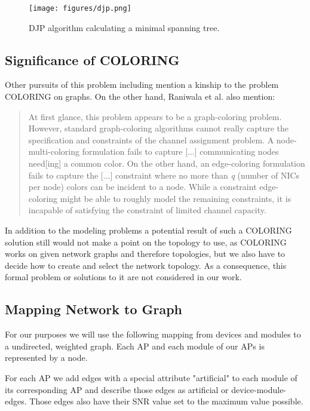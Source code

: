     \begin{figure}[th!]
      \centering
      \texttt{[image: figures/djp.png]}
      \caption{\ac{DJP} algorithm calculating a minimal spanning tree.}
      \label{fig:djp}
    \end{figure}
    
  \subsection{Significance of COLORING}
    Other pursuits of this problem including \cite{katzela, BFS-CA, caa_tricky, CTA} mention a kinship to the problem COLORING on graphs.
    On the other hand, Raniwala et al. \cite{caa_tricky} also mention:
    
    \begin{quote}
      At first glance, this problem appears to be a graph-coloring problem. However, standard graph-coloring algorithms cannot really capture the specification and constraints 
      of the channel assignment problem. A node-multi-coloring formulation fails to capture [...] communicating nodes need[ing] a common color. On the other hand,
      an edge-coloring formulation fails to capture the [...] constraint where no more than \textit{q} (number of NICs per node) colors can be incident to a node.
      While a constraint edge-coloring might be able to roughly model the remaining constraints, it is incapable of satisfying the constraint of limited channel capacity.
    \end{quote}
    
    In addition to the modeling problems a potential result of such a COLORING solution still would not make a point on the topology to use,
    as COLORING works on given network graphs and therefore topologies, but we also have to decide how to create and select the network topology.
    As a consequence, this formal problem or solutions to it are not considered in our work.
    
  \subsection{Mapping Network to Graph}
    For our purposes we will use the following mapping from devices and modules to a undirected, weighted graph.
    Each \ac{AP} and each module of our APs is represented by a node.
    
    For each \ac{AP} we add edges with a special attribute "artificial" 
    to each module of its corresponding \ac{AP} and describe those edges as artificial or device-module-edges.
    Those edges also have their \ac{SNR} value set to the maximum value possible. 
    
